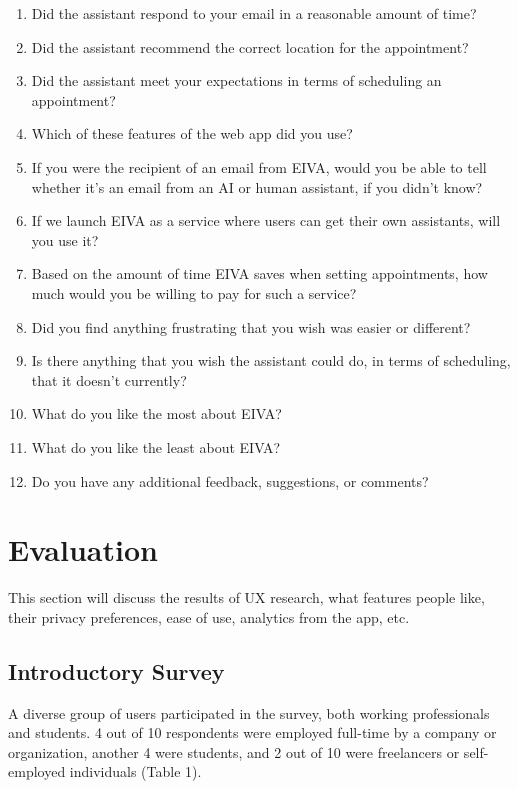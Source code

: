 \documentclass{article}
\begin{document}
\begin{enumerate}
	\item Did the assistant respond to your email in a reasonable amount of time?
	\item Did the assistant recommend the correct location for the appointment?
	\item Did the assistant meet your expectations in terms of scheduling an appointment?
	\item Which of these features of the web app did you use?
	\item If you were the recipient of an email from EIVA, would you be able to tell whether it's an email from an AI or human assistant, if you didn't know?
	\item If we launch EIVA as a service where users can get their own assistants, will you use it?
	\item Based on the amount of time EIVA saves when setting appointments, how much would you be willing to pay for such a service?
	\item Did you find anything frustrating that you wish was easier or different?
	\item Is there anything that you wish the assistant could do, in terms of scheduling, that it doesn't currently?
	\item What do you like the most about EIVA?
	\item What do you like the least about EIVA?
	\item Do you have any additional feedback, suggestions, or comments?
\end{enumerate}

\newpage

\section{Evaluation}

This section will discuss the results of UX research, what features people like, their privacy preferences, ease of use, analytics from the app, etc.

\subsection{Introductory Survey}

A diverse group of users participated in the survey, both working professionals and students. 4 out of 10 respondents were employed full-time by a company or organization, another 4 were students, and 2 out of 10 were freelancers or self-employed individuals (Table 1).
\end{document}
